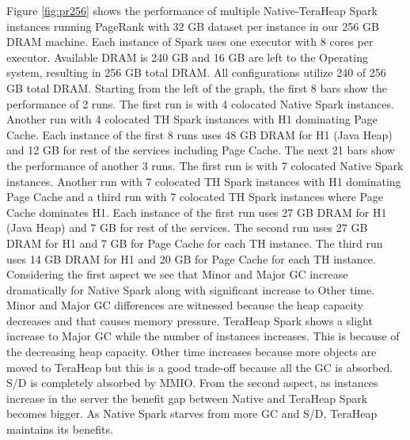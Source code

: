 Figure \ref{fig:pr256} shows the performance of multiple
Native-TeraHeap Spark instances running PageRank with 32 GB
dataset per instance in our 256 GB DRAM machine. Each instance of Spark
uses one executor with 8 cores per executor. Available DRAM is 240 GB
and 16 GB are left to the Operating system, resulting in 256 GB total
DRAM. All configurations utilize 240 of 256 GB total DRAM.
Starting from the left of the graph, the first 8 bars show the
performance of 2 runs. The first run is with 4 colocated Native Spark instances.
Another run with 4 colocated TH Spark instances with H1 dominating Page Cache.
Each instance of the first 8 runs uses 48 GB DRAM for H1 (Java Heap) and 12 GB for rest of the services including Page Cache.
The next 21 bars show the performance of another 3 runs. The first run is with 7 colocated Native Spark instances.
Another run with 7 colocated TH Spark instances with H1 dominating Page Cache
and a third run with 7 colocated TH Spark instances where Page Cache dominates H1.
Each instance of the first run uses 27 GB DRAM for H1 (Java Heap) and 7 GB for rest of the services.
The second run uses 27 GB DRAM for H1 and 7 GB for Page Cache for each TH instance.
The third run uses 14 GB DRAM for H1 and 20 GB for Page Cache for each TH instance.
Considering the first aspect we see that Minor and Major GC increase dramatically for Native Spark along with significant increase to Other time. Minor and Major GC differences are witnessed because the heap capacity decreases and that causes memory pressure. TeraHeap Spark shows a slight increase to Major GC while the number of instances increases. This is because of the decreasing heap capacity. Other time increases because more objects are moved to TeraHeap but this is a good trade-off because all the GC is absorbed. S/D is completely absorbed by MMIO. From the second aspect, as instances increase in the server the benefit gap between Native and TeraHeap Spark becomes bigger. As Native Spark starves from more GC and S/D, TeraHeap maintains its benefits.

